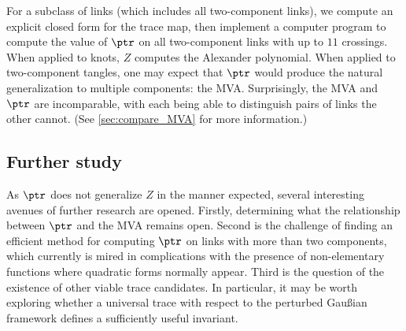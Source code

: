 For a subclass of links (which includes all two-component links), we compute an
explicit closed form for the trace map, then implement a computer program to
compute the value of $\ptr$ on all two-component links with up to $11$
crossings. When applied to knots, $Z$ computes the Alexander
polynomial. When applied to two-component
tangles, one may expect that $\ptr$ would produce the natural generalization to
multiple components: the \ac{MVA}. Surprisingly, the \ac{MVA} and $\ptr$ are
incomparable, with each being able to distinguish pairs of links the other
cannot. (See \cref{sec:compare_MVA} for more information.)

\subsection{Further study}
As $\ptr$ does not generalize $Z$ in the manner expected, several interesting
avenues of further research are opened. Firstly, determining what the
relationship between $\ptr$ and the \ac{MVA} remains open. Second is the
challenge of finding an efficient method for computing $\ptr$ on links with more
than two components, which currently is mired in complications with
the presence of non-elementary functions where quadratic forms normally appear.
Third is the question of the existence of other viable trace candidates. In
particular, it may be worth exploring whether a universal trace with respect to
the perturbed Gaußian framework defines a sufficiently useful invariant.
